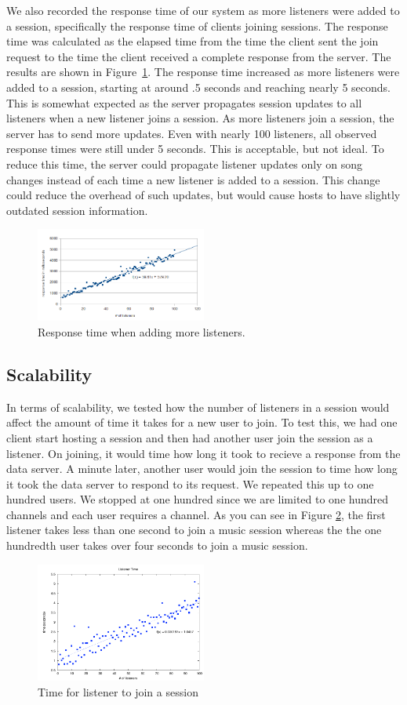 We also recorded the response time of our system as more listeners
were added to a session, specifically the response time of
clients joining sessions.
The response time was calculated as the
elapsed time from the time the client sent the join request
to the time the client
received a complete response from the server. The results are shown in
Figure~\ref{fig:addListenersResponseTime}. The response time
increased as more listeners were added to a session, starting at
around .5 seconds and reaching nearly 5 seconds. This is somewhat
expected as the server propagates session updates to all listeners
when a new listener joins a session. As more listeners join a
session, the server has to send more updates. Even with nearly
100 listeners, all observed response times were still under 5 seconds. This
is acceptable, but not ideal. To reduce this time, the server
could propagate listener updates only on song changes instead of each
time a new listener is added to a session.
This change could reduce the overhead of such updates, but would cause hosts
to have slightly outdated session information.

\begin{figure}[h]
	\centering
	\includegraphics[width=0.5\textwidth]{add_listeners_response_time.png}
	\caption{Response time when adding more listeners.}
	\label{fig:addListenersResponseTime}
\end{figure}

\subsection{Scalability}
In terms of scalability, we tested how   
the number of listeners in a session 
would affect the amount of time it takes 
for a new user to join. 
To test this, we had one client start hosting a session and then had 
another user join the session as a listener. On joining, it would time 
how long it took to recieve a response from the data server. 
A minute later, another user would 
join the session to time how long it took the data server to respond to its request. 
We repeated this up to one hundred 
users. We stopped at one hundred  since we are limited to one hundred channels
and each user requires a channel. As you can see in Figure \ref{fig:addListenersJoinTime}, 
the first listener takes less than one second to join a music session 
whereas the the one hundredth user takes over four seconds to join a music session.  

\begin{figure}[h]
	\centering
	\includegraphics[width=0.5\textwidth]{deployed_time5.pdf}
	\caption{Time for listener to join a session}
	\label{fig:addListenersJoinTime}
\end{figure}

